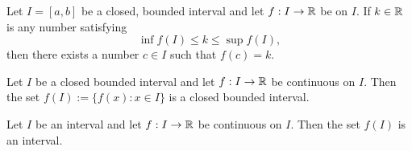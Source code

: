 \begin{corollary}
	Let $I=[a,b]$ be a closed, bounded interval and let $f:I \rightarrow \mathbb{R}$ be on $I$. If $k \in \mathbb{R}$ is any number satisfying
	\[\inf f(I) \leq k \leq \sup f(I),\]
	then there exists a number $c \in I$ such that $f(c) = k$.
\end{corollary}

\begin{theorem}
	Let $I$ be a closed bounded interval and let $f:I \rightarrow \mathbb{R}$ be continuous on $I$. Then the set $f(I):= \{f(x): x \in I\}$ is a closed bounded interval.
\end{theorem}

\begin{theorem}
	Let $I$ be an interval and let $f: I \rightarrow \mathbb{R}$ be continuous on $I$. Then the set $f(I)$ is an interval.
\end{theorem}
